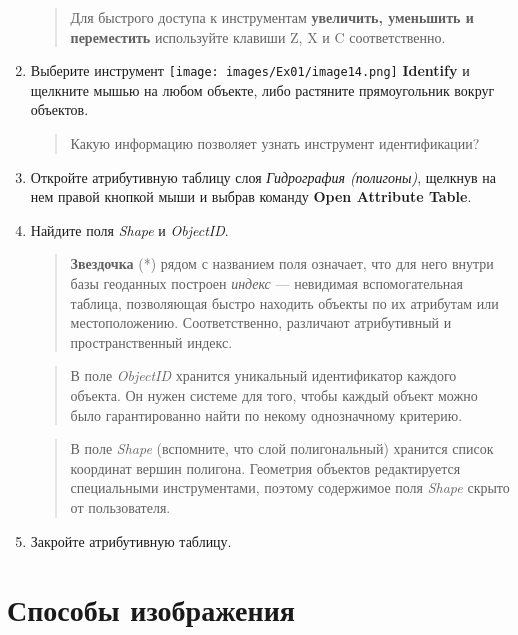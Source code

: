 \documentclass[12pt,]{book}
\begin{document}
\begin{enumerate}
  \begin{quote}
  Для быстрого доступа к инструментам \textbf{увеличить, уменьшить и переместить} используйте клавиши Z, X и C соответственно.
  \end{quote}
\item
  Выберите инструмент \texttt{[image: images/Ex01/image14.png]} \textbf{Identify} и щелкните мышью на любом объекте, либо растяните прямоугольник вокруг объектов.

  \begin{quote}
  Какую информацию позволяет узнать инструмент идентификации?
  \end{quote}
\item
  Откройте атрибутивную таблицу слоя \emph{Гидрография (полигоны)}, щелкнув на нем правой кнопкой мыши и выбрав команду \textbf{Open Attribute Table}.
\item
  Найдите поля \emph{Shape} и \emph{ObjectID}.

  \begin{quote}
  \textbf{Звездочка} (*) рядом с названием поля означает, что для него внутри базы геоданных построен \emph{индекс} --- невидимая вспомогательная таблица, позволяющая быстро находить объекты по их атрибутам или местоположению. Соответственно, различают атрибутивный и пространственный индекс.
  \end{quote}

  \begin{quote}
  В поле \emph{ObjectID} хранится уникальный идентификатор каждого объекта. Он нужен системе для того, чтобы каждый объект можно было гарантированно найти по некому однозначному критерию.
  \end{quote}

  \begin{quote}
  В поле \emph{Shape} (вспомните, что слой полигональный) хранится список координат вершин полигона. Геометрия объектов редактируется специальными инструментами, поэтому содержимое поля \emph{Shape} скрыто от пользователя.
  \end{quote}
\item
  Закройте атрибутивную таблицу.
\end{enumerate}

\hypertarget{map-design-quaternary-representations}{%
\section{Способы изображения}\label{map-design-quaternary-representations}}
\end{document}
